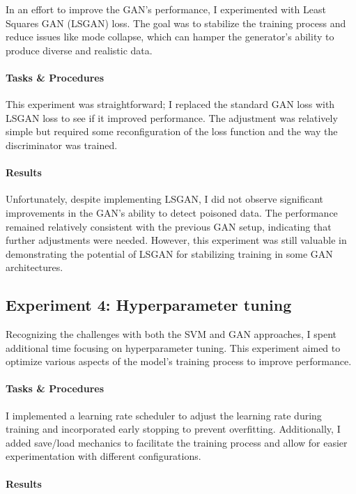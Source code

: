 \documentclass[14]{article}
\begin{document}
In an effort to improve the GAN's performance, I experimented with Least Squares GAN (LSGAN) loss. The goal was to stabilize the training process and reduce issues like mode collapse, which can hamper the generator’s ability to produce diverse and realistic data.

\paragraph{Tasks \& Procedures}

This experiment was straightforward; I replaced the standard GAN loss with LSGAN loss to see if it improved performance. The adjustment was relatively simple but required some reconfiguration of the loss function and the way the discriminator was trained.

\paragraph{Results}

Unfortunately, despite implementing LSGAN, I did not observe significant improvements in the GAN’s ability to detect poisoned data. The performance remained relatively consistent with the previous GAN setup, indicating that further adjustments were needed. However, this experiment was still valuable in demonstrating the potential of LSGAN for stabilizing training in some GAN architectures.

\subsection{Experiment 4: Hyperparameter tuning}

Recognizing the challenges with both the SVM and GAN approaches, I spent additional time focusing on hyperparameter tuning. This experiment aimed to optimize various aspects of the model’s training process to improve performance.

\paragraph{Tasks \& Procedures}

I implemented a learning rate scheduler to adjust the learning rate during training and incorporated early stopping to prevent overfitting. Additionally, I added save/load mechanics to facilitate the training process and allow for easier experimentation with different configurations.

\paragraph{Results}
\end{document}
